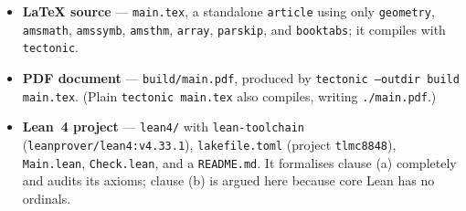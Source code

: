 \documentclass[11pt]{article}
\theoremstyle{definition}
\theoremstyle{remark}
\begin{document}
\begin{itemize}
  \item \textbf{LaTeX source} --- \texttt{main.tex}, a standalone
    \texttt{article} using only \texttt{geometry}, \texttt{amsmath},
    \texttt{amssymb}, \texttt{amsthm}, \texttt{array}, \texttt{parskip}, and
    \texttt{booktabs}; it compiles with \texttt{tectonic}.
  \item \textbf{PDF document} --- \texttt{build/main.pdf}, produced by
    \texttt{tectonic --outdir build main.tex}. (Plain \texttt{tectonic
    main.tex} also compiles, writing \texttt{./main.pdf}.)
  \item \textbf{Lean~4 project} --- \texttt{lean4/} with \texttt{lean-toolchain}
    (\texttt{leanprover/lean4:v4.33.1}), \texttt{lakefile.toml} (project
    \texttt{tlmc8848}), \texttt{Main.lean}, \texttt{Check.lean}, and a
    \texttt{README.md}. It formalises clause (a) completely and audits its
    axioms; clause (b) is argued here because core Lean has no ordinals.
\end{itemize}
\end{document}
